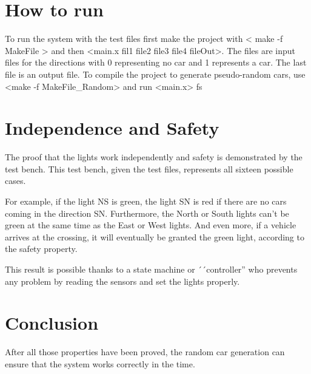 
\section{How to run}
To run the system with the test files first make the project with < make -f MakeFile > and then <main.x fil1 file2 file3 file4 fileOut>. The files are input files for the directions with 0 representing no car and 1 represents a car. The last file is an output file. To compile the project to generate pseudo-random cars, use <make -f MakeFile_Random> and run <main.x> fs

\section{Independence and Safety}

The proof that the lights work independently and safety is demonstrated by the test bench. This test bench, given the test files, represents all sixteen possible cases.

For example, if the light NS is green, the light SN is red if there are no cars coming in the direction SN.
Furthermore, the North or South lights can't be green at the same time as the East or West lights.
And even more, if a vehicle arrives at the crossing, it will eventually be granted the green light, according to the safety property.

This result is possible thanks to a state machine or ´´controller'' who prevents any problem by reading the sensors and set the lights properly. 

\section{Conclusion}

After all those properties have been proved, the random car generation can ensure that the system works correctly in the time. 
